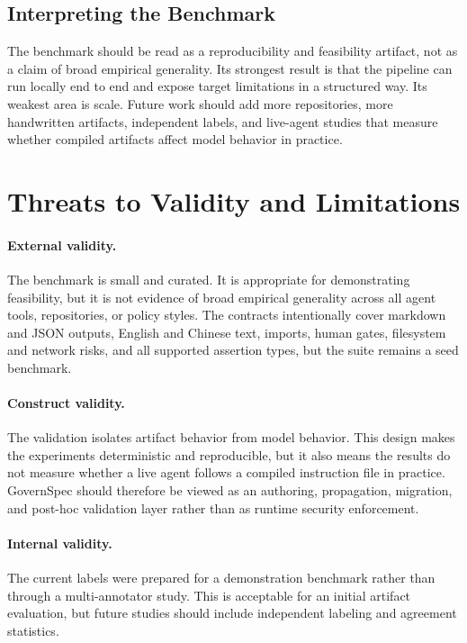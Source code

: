 \documentclass[11pt]{article}
\begin{document}
\subsection{Interpreting the Benchmark}

The benchmark should be read as a reproducibility and feasibility artifact, not as a
claim of broad empirical generality. Its strongest result is that the pipeline can
run locally end to end and expose target limitations in a structured way. Its
weakest area is scale. Future work should add more repositories, more handwritten
artifacts, independent labels, and live-agent studies that measure whether compiled
artifacts affect model behavior in practice.

\section{Threats to Validity and Limitations}

\paragraph{External validity.}
The benchmark is small and curated. It is appropriate for demonstrating feasibility,
but it is not evidence of broad empirical generality across all agent tools,
repositories, or policy styles. The contracts intentionally cover markdown and JSON
outputs, English and Chinese text, imports, human gates, filesystem and network
risks, and all supported assertion types, but the suite remains a seed benchmark.

\paragraph{Construct validity.}
The validation isolates artifact behavior from model behavior. This design makes the
experiments deterministic and reproducible, but it also means the results do not
measure whether a live agent follows a compiled instruction file in practice.
GovernSpec should therefore be viewed as an authoring, propagation, migration, and
post-hoc validation layer rather than as runtime security enforcement.

\paragraph{Internal validity.}
The current labels were prepared for a demonstration benchmark rather than through a
multi-annotator study. This is acceptable for an initial artifact evaluation, but
future studies should include independent labeling and agreement statistics.
\end{document}
